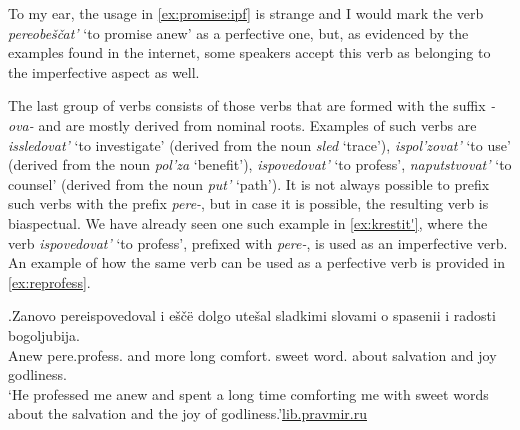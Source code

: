To my ear, the usage in \ref{ex:promise:ipf} is strange and I would mark the verb \textit{pereobe\v{s}\v{c}at'} `to promise anew' as a perfective one, but, as evidenced by the examples found in the internet, some speakers accept this verb as belonging to the imperfective aspect as well.

The last group of verbs consists of those verbs that are formed with the suffix \textit{-ova-} and are mostly derived from nominal roots. Examples of such verbs are \textit{issledovat'} `to investigate' (derived from the noun \textit{sled} `trace'), \textit{ispol'zovat'} `to use' (derived from the noun \textit{pol'za} `benefit'), \textit{ispovedovat'} `to profess', \textit{naputstvovat'} `to counsel' (derived from the noun \textit{put'} `path'). It is not always possible to prefix such verbs with the  prefix \textit{pere-}, but in case it is possible, the resulting verb is biaspectual. We have already seen one such example in \ref{ex:krestit'}, where the verb \textit{ispovedovat'} `to profess', prefixed with \textit{pere-}, is used as an imperfective verb. An example of how the same verb can be used as a perfective verb is provided in \ref{ex:reprofess}.

\exg.\label{ex:reprofess}Zanovo pereispovedoval i e\v{s}\v{c}\"{e} dolgo ute\v{s}al sladkimi slovami o spasenii i radosti bogoljubija.\\
Anew pere.profess. and more long comfort. sweet word. about salvation and joy godliness.\\
\trans `He professed me anew and spent a long time comforting me with sweet words about the salvation and the joy of godliness.'\hbox{}\hfill\hbox{\url{lib.pravmir.ru}}



